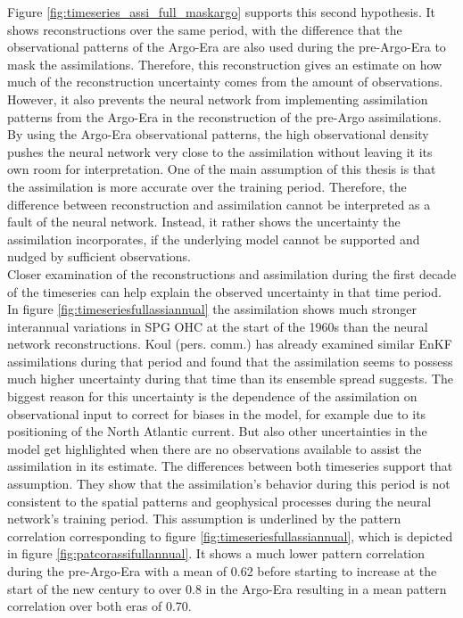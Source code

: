 \documentclass[Masterarbeit.tex]{subfile}
\begin{document}
	
	Figure \ref{fig:timeseries_assi_full_maskargo} supports this second hypothesis. It shows reconstructions over the same period, with the difference that the observational patterns of the Argo-Era are also used during the pre-Argo-Era to mask the assimilations. Therefore, this reconstruction gives an estimate on how much of the reconstruction uncertainty comes from the amount of observations. However, it also prevents the neural network from implementing assimilation patterns from the Argo-Era in the reconstruction of the pre-Argo assimilations. By using the Argo-Era observational patterns, the high observational density pushes the neural network very close to the assimilation without leaving it its own room for interpretation. One of the main assumption of this thesis is that the assimilation is more accurate over the training period. Therefore, the difference between reconstruction and assimilation cannot be interpreted as a fault of the neural network. Instead, it rather shows the uncertainty the assimilation incorporates, if the underlying model cannot be supported and nudged by sufficient observations. \\
	Closer examination of the reconstructions and assimilation during the first decade of the timeseries can help explain the observed uncertainty in that time period. In figure \ref{fig:timeseriesfullassiannual} the assimilation shows much stronger interannual variations in SPG OHC at the start of the 1960s than the neural network reconstructions. Koul (pers. comm.) has already examined similar EnKF assimilations during that period and found that the assimilation seems to possess much higher uncertainty during that time than its ensemble spread suggests. The biggest reason for this uncertainty is the dependence of the assimilation on observational input to correct for biases in the model, for example due to its positioning of the North Atlantic current. But also other uncertainties in the model get highlighted when there are no observations available to assist the assimilation in its estimate. The differences between both timeseries support that assumption. They show that the assimilation's behavior during this period is not consistent to the spatial patterns and geophysical processes during the neural network's training period. This assumption is underlined by the pattern correlation corresponding to figure \ref{fig:timeseriesfullassiannual}, which is depicted in figure \ref{fig:patcorassifullannual}. It shows a much lower pattern correlation during the pre-Argo-Era with a mean of 0.62 before starting to increase at the start of the new century to over 0.8 in the Argo-Era resulting in a mean pattern correlation over both eras of 0.70. 
	
\end{document}
